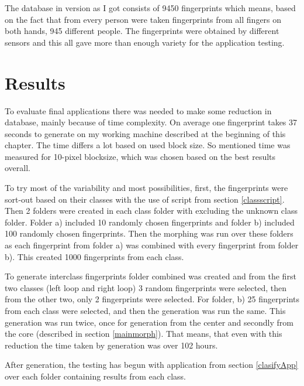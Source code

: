 The database in version as I got consists of 9450 fingerprints which means, based on the fact that from every person were taken fingerprints from all fingers on both hands, 945 different people. The fingerprints were obtained by different sensors and this all gave more than enough variety for the application testing.

\section{Results}
To evaluate final applications there was needed to make some reduction in database, mainly because of time complexity. On average one fingerprint takes 37 seconds to generate on my working machine described at the beginning of this chapter. The time differs a lot based on used block size. So mentioned time was measured for 10-pixel blocksize, which was chosen based on the best results overall.

To try most of the variability and most possibilities, first, the fingerprints were sort-out based on their classes with the use of script from section \ref{classscript}. Then 2 folders were created in each class folder with excluding the unknown class folder. Folder a) included 10 randomly chosen fingerprints and folder b) included 100 randomly chosen fingerprints. Then the morphing was run over these folders as each fingerprint from folder a) was combined with every fingerprint from folder b). This created 1000 fingerprints from each class.

To generate interclass fingerprints folder combined was created and from the first two classes (left loop and right loop) 3 random fingerprints were selected, then from the other two, only 2 fingerprints were selected. For folder, b) 25 fingerprints from each class were selected, and then the generation was run the same. This generation was run twice, once for generation from the center and secondly from the core (described in section \ref{mainmorph}). That means, that even with this reduction the time taken by generation was over 102 hours.

After generation, the testing has begun with application from section \ref{clasifyApp} over each folder containing results from each class. 

